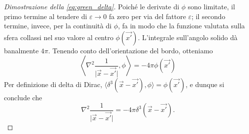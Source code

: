 \begin{proof}[Dimostrazione della \eqref{eq:green_delta}]
Poiché le derivate di $\phi$ sono limitate, il primo termine al tendere di $\varepsilon \to 0$ fa zero per via del fattore $\varepsilon$; il secondo termine, invece, per la continuità di $\phi$, fa in modo che la funzione valutata sulla sfera collassi nel suo valore al centro $\phi(\vec{x'})$. L'integrale sull'angolo solido dà banalmente $4\pi$. 
Tenendo conto dell'orientazione del bordo, otteniamo
$$
\left\langle \nabla^2 \frac{1}{\vert{}\vec{x}-\vec{x'}\vert{}}, \phi \right\rangle = -4\pi \phi(\vec{x'})
$$
Per definizione di delta di Dirac, $\langle \delta^3(\vec{x} - \vec{x'}), \phi \rangle = \phi(\vec{x'})$, e dunque si conclude che
$$
\nabla^2 \frac{1}{\vert{}\vec{x}-\vec{x'}\vert{}} = -4\pi \delta^3(\vec{x} - \vec{x'}).
$$
\end{proof}
